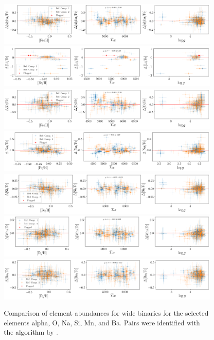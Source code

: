 \documentclass[fleqn,usenatbib,useAMS]{mnras}
\begin{document}
\begin{figure}
\centering
\includegraphics[width=\textwidth]{figures/wide_binaries_alpha.png}
\includegraphics[width=\textwidth]{figures/wide_binaries_Li.png}
\includegraphics[width=\textwidth]{figures/wide_binaries_O.png}
\includegraphics[width=\textwidth]{figures/wide_binaries_Na.png}
\includegraphics[width=\textwidth]{figures/wide_binaries_Si.png}
\includegraphics[width=\textwidth]{figures/wide_binaries_Mn.png}
\includegraphics[width=\textwidth]{figures/wide_binaries_Ba.png}
\caption{Comparison of element abundances for wide binaries for the selected elements alpha, O, Na, Si, Mn, and Ba. Pairs were identified with the algorithm by \citet{ElBadry2018c}.}
\label{fig:wide_binary_ab}
\end{figure}
\end{document}
